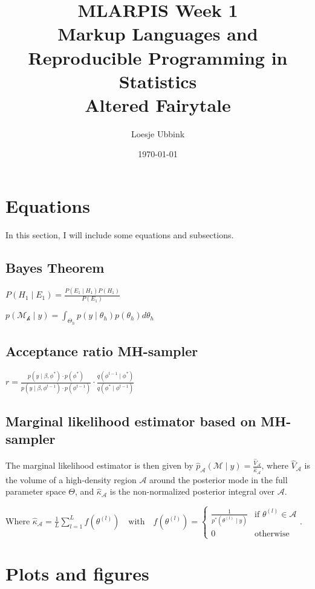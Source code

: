 \documentclass[10pt, a4paper, titlepage]{article}
\title{MLARPIS Week 1\\ \small Markup Languages and Reproducible Programming in Statistics \\ \small Altered Fairytale}
\author{Loesje Ubbink}
\date{\today}
\begin{document}
\maketitle
\newpage

\section{Equations}

In this section, I will include some equations and subsections.

\subsection{Bayes Theorem}

$P(H_1\mid E_1) = \frac{P(E_1\mid H_1)P(H_1)}{P(E_1)}$

$p(\mathcal{M_h}\mid y) = \int_{\Theta_h} p(y \mid \theta_h)p(\theta_h) d \theta_h$

\subsection{Acceptance ratio MH-sampler}
$r = \frac {p(y \mid \beta,\phi^*) \cdot p(\phi^*)}{p(y \mid \beta,\phi^{t-1}) \cdot p(\phi^{t-1})}\cdot \frac{q(\phi^{t-1}\mid \phi^*)}{q(\phi^*\mid \phi^{t-1})}$

\subsection{Marginal likelihood estimator based on MH-sampler}
The marginal likelihood estimator is then given by $\widehat{p}_{\mathcal{A}}(\mathcal{M}\mid y) = \frac{\widehat{V}_{\mathcal{A}}}{\widehat{\kappa}_{\mathcal{A}}}$, where $\widehat{V}_{\mathcal{A}}$ is the volume of a high-density region $\mathcal{A}$ around the posterior mode in the full parameter space $\Theta$, and $\widehat{\kappa}_{\mathcal{A}}$ is the non-normalized posterior integral over $\mathcal{A}$. 

Where $\widehat{\kappa}_{\mathcal{A}} =\frac{1}{L} \sum_{l=1}^{L} f(\theta^{(l)}) \quad \text{with}\quad f(\theta^{(l)}) = \begin{cases}\frac{1}{p^*(\theta^{(l)} \mid y)} & \text{if }\theta^{(l)} \in \mathcal{A} \\0 & \text{otherwise}\end{cases}$.

\section{Plots and figures}
\end{document}
